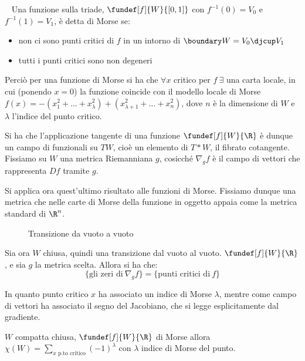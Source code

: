 \begin{defn}
~
Una funzione sulla triade, $\fundef[f]{W}{[0,1]}$ con $f^{-1}(0)=V_0$ e $f^{-1}(1)=V_1$, è detta di Morse se:
\begin{itemize}
\item non ci sono punti critici di $f$ in un intorno di $\boundary W = V_0\djcup V_1$
\item tutti i punti critici sono non degeneri
\end{itemize}
\end{defn}

Perciò per una funzione di Morse si ha che $\forall x$ critico per $f~\exists$ una carta locale, in cui (ponendo \wlg $x=0$) la funzione coincide con il modello locale di Morse $f(x) = -(x_1^2 + \dots + x_{\lambda}^2) + (x_{\lambda+1}^2 + \dots + x_n^2)$, dove $n$ è la dimensione di $W$ e $\lambda$ l'indice del punto critico.


Si ha che l'applicazione tangente di una funzione $\fundef[f]{W}{\R}$ è dunque un campo di funzionali su $TW$, cioè un elemento di $T*W$, il fibrato cotangente.
Fissiamo su $W$ una metrica Riemanniana $g$, cosicché $\nabla _g f$ è il campo di vettori che rappresenta $Df$ tramite $g$.

Si applica ora quest'ultimo risultato alle funzioni di Morse. Fissiamo dunque una metrica che nelle carte di Morse della funzione in oggetto appaia come la metrica standard di $\R^n$.

\begin{figure}[h]
\centering

\caption{Transizione da vuoto a vuoto}
\end{figure}

Sia ora $W$ chiusa, quindi una transizione dal vuoto al vuoto. $\fundef[f]{W}{\R}$, e sia $g$ la metrica scelta. Allora si ha che:
\begin{equation*}
\{\text{gli zeri di}~\nabla_g f\} = \{\text{punti critici di}~f\}
\end{equation*}

In quanto punto critico $x$ ha associato un indice di Morse $\lambda$, mentre come campo di vettori ha associato il segno del Jacobiano, che si legge esplicitamente dal gradiente.

\begin{teo}
$W$ compatta chiusa, $\fundef[f]{W}{\R}$ di Morse allora $\chi(W)=\sum_{\text{$x$ p.to critico}} (-1)^{\lambda}$ con $\lambda$ indice di Morse del punto.
\end{teo}

